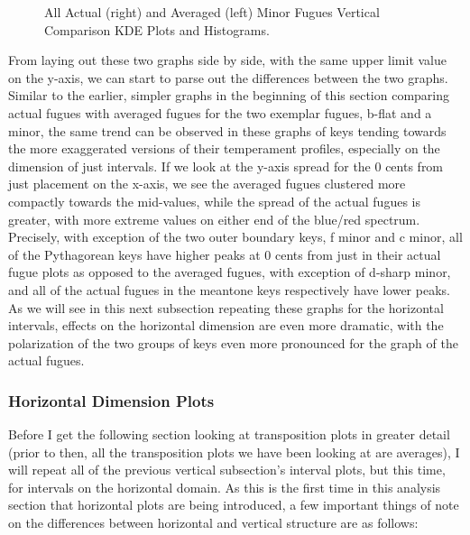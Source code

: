 \begin{figure}[H]
    \begin{center}
    \caption[Actual and Averaged Minor Fugues Vertical Comparison KDE Plots and Histograms. ]{All Actual (right) and Averaged (left) Minor Fugues Vertical Comparison KDE Plots and Histograms.}
    \end{center}
\end{figure}
    
    From laying out these two graphs side by side, with the same upper limit
value on the y-axis, we can start to parse out the differences between
the two graphs. Similar to the earlier, simpler graphs in the beginning
of this section comparing actual fugues with averaged fugues for the two
exemplar fugues, b-flat and a minor, the same trend can be observed in
these graphs of keys tending towards the more exaggerated versions of
their temperament profiles, especially on the dimension of just
intervals. If we look at the y-axis spread for the 0 cents from just
placement on the x-axis, we see the averaged fugues clustered more
compactly towards the mid-values, while the spread of the actual fugues
is greater, with more extreme values on either end of the blue/red
spectrum. Precisely, with exception of the two outer boundary keys, f
minor and c minor, all of the Pythagorean keys have higher peaks at 0
cents from just in their actual fugue plots as opposed to the averaged
fugues, with exception of d-sharp minor, and all of the actual fugues in
the meantone keys respectively have lower peaks. As we will see in this
next subsection repeating these graphs for the horizontal intervals,
effects on the horizontal dimension are even more dramatic, with the
polarization of the two groups of keys even more pronounced for the
graph of the actual fugues.

    \subsubsection{Horizontal Dimension
Plots}\label{horizontal-dimension-plots}

Before I get the following section looking at transposition plots in
greater detail (prior to then, all the transposition plots we have been
looking at are averages), I will repeat all of the previous vertical
subsection's interval plots, but this time, for intervals on the
horizontal domain. As this is the first time in this analysis section
that horizontal plots are being introduced, a few important things of
note on the differences between horizontal and vertical structure are as
follows:

